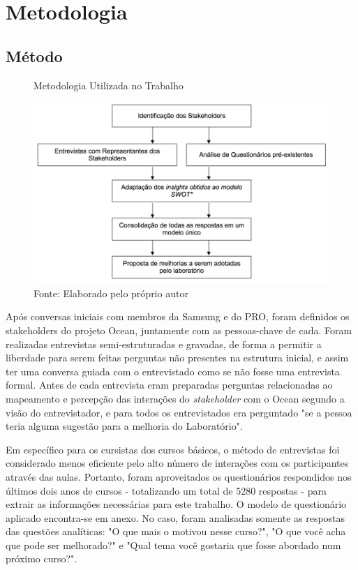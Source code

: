 
\chapter{Metodologia}

\section{Método}

\label{chap:metodologia}

\begin{figure}[h]
\caption{Metodologia Utilizada no Trabalho}
\centerline{\includegraphics[scale=0.5]{img/metodologia}}
\label{fig:metodologia}
\caption* {Fonte: Elaborado pelo próprio autor}
\end{figure}

Após conversas iniciais com membros da Samsung e do PRO, foram definidos os stakeholders do projeto Ocean, juntamente com as pessoas-chave de cada. Foram realizadas entrevistas semi-estruturadas e gravadas, de forma a permitir a liberdade para serem feitas perguntas não presentes na estrutura inicial, e assim ter uma conversa guiada com o entrevistado como se não fosse uma entrevista formal. Antes de cada entrevista eram preparadas perguntas relacionadas ao mapeamento e percepção das interações do \textit{stakeholder} com o Ocean segundo a visão do entrevistador, e para todos os entrevistados era perguntado "se a pessoa teria alguma sugestão para a melhoria do Laboratório".

Em específico para os cursistas dos cursos básicos, o método de entrevistas foi considerado menos eficiente pelo alto número de interações com os participantes através das aulas. Portanto, foram aproveitados os questionários respondidos nos últimos dois anos de cursos - totalizando um total de 5280 respostas - para extrair as informações necessárias para este trabalho. O modelo de questionário aplicado encontra-se em anexo. No caso, foram analisadas somente as respostas das questões analíticas: "O que mais o motivou nesse curso?", "O que você acha que pode ser melhorado?" e "Qual tema você gostaria que fosse abordado num próximo curso?".

